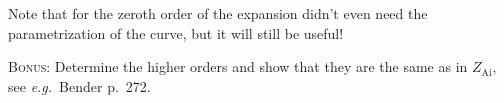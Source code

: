 \documentclass{exam}
\DeclareMathOperator*{\Ai}{Ai}
\begin{document}
\begin{questions}
\begin{parts}
        Note that for the zeroth order of the expansion didn't even need the parametrization of the curve,
        but it will still be useful!
        
        \textsc{Bonus:} Determine the higher orders and show that they are the same as in $Z_{\Ai}$, see
        \emph{e.g.}\ Bender p.\ 272. 
        
    \end{parts}

    
    
\end{questions}
\end{document}
